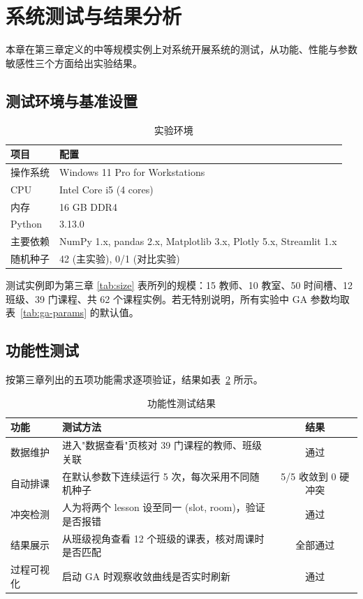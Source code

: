 \hspace*{\fill}

\section{系统测试与结果分析}

本章在第三章定义的中等规模实例上对系统开展系统的测试，从功能、性能与参数敏感性三个方面给出实验结果。

\subsection{测试环境与基准设置}

\begin{table}[H]
  \centering
  \caption{实验环境}
  \label{tab:env}
  \begin{tabularx}{\linewidth}{l X}
    \toprule
    \textbf{项目} & \textbf{配置} \\
    \midrule
    操作系统 & Windows 11 Pro for Workstations \\
    CPU & Intel Core i5 (4 cores) \\
    内存 & 16 GB DDR4 \\
    Python & 3.13.0 \\
    主要依赖 & NumPy 1.x, pandas 2.x, Matplotlib 3.x, Plotly 5.x, Streamlit 1.x \\
    随机种子 & 42 (主实验), 0/1 (对比实验) \\
    \bottomrule
  \end{tabularx}
\end{table}

测试实例即为第三章 \ref{tab:size} 表所列的规模：15 教师、10 教室、50 时间槽、12 班级、39 门课程、共 62 个课程实例。若无特别说明，所有实验中 GA 参数均取表~\ref{tab:ga-params} 的默认值。

\subsection{功能性测试}

按第三章列出的五项功能需求逐项验证，结果如表~\ref{tab:func} 所示。

\begin{table}[H]
  \centering
  \caption{功能性测试结果}
  \label{tab:func}
  \begin{tabularx}{\linewidth}{l X c}
    \toprule
    \textbf{功能} & \textbf{测试方法} & \textbf{结果} \\
    \midrule
    数据维护 & 进入"数据查看"页核对 39 门课程的教师、班级关联 & 通过 \\
    自动排课 & 在默认参数下连续运行 5 次，每次采用不同随机种子 & 5/5 收敛到 0 硬冲突 \\
    冲突检测 & 人为将两个 lesson 设至同一 (slot, room)，验证是否报错 & 通过 \\
    结果展示 & 从班级视角查看 12 个班级的课表，核对周课时是否匹配 & 全部通过 \\
    过程可视化 & 启动 GA 时观察收敛曲线是否实时刷新 & 通过 \\
    \bottomrule
  \end{tabularx}
\end{table}

